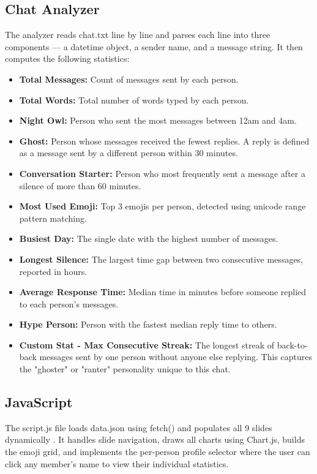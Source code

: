 \documentclass{report}
\begin{document}
\subsection{Chat Analyzer}
The analyzer reads chat.txt line by line and parses each line into three components — a datetime object, a sender name, and a message string. It then computes the following statistics:

\begin{itemize}
    \item \textbf{Total Messages:} Count of messages sent by each person.
    \item \textbf{Total Words:} Total number of words typed by each person.
    \item \textbf{Night Owl:} Person who sent the most messages between 12am and 4am.
    \item \textbf{Ghost:} Person whose messages received the fewest replies. A reply is defined as a message sent by a different person within 30 minutes.
    \item \textbf{Conversation Starter:} Person who most frequently sent a message after a silence of more than 60 minutes.
    \item \textbf{Most Used Emoji:} Top 3 emojis per person, detected using unicode range pattern matching.
    \item \textbf{Busiest Day:} The single date with the highest number of messages.
    \item \textbf{Longest Silence:} The largest time gap between two consecutive messages, reported in hours.
    \item \textbf{Average Response Time:} Median time in minutes before someone replied to each person's messages.
    \item \textbf{Hype Person:} Person with the fastest median reply time to others.
    \item \textbf{Custom Stat - Max Consecutive Streak:} The longest streak of back-to-back messages sent by one person without anyone else replying. This captures the "ghoster" or "ranter" personality unique to this chat.
\end{itemize}

\subsection{JavaScript}
The script.js file loads data.json using fetch() and populates all 9 slides dynamically \cite{mdn}. It handles slide navigation, draws all charts using Chart.js, builds the emoji grid, and implements the per-person profile selector where the user can click any member's name to view their individual statistics.
\end{document}
